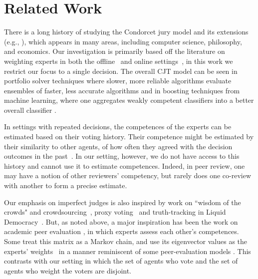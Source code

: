 \documentclass[letterpaper]{article} %
\begin{document}
\section{Related Work}
%
There is a long history of studying the Condorcet jury model and its extensions (e.g., \citet{berend1998condorcet,ben2000nonasymptotic,grofman1978judgmental,feld1984accuracy}), which appears in many areas, including computer science, philosophy, and economics. Our investigation is primarily based off the literature on weighting experts in both the offline~\cite{shapley1984optimizing,nitzan1982optimal} and online settings~\cite{cesa1997use,vovk1990aggregating,freeman2020no, berend2015finite}, in this work we restrict our focus to a single decision. The overall CJT model can be seen in portfolio solver techniques where slower, more reliable algorithms evaluate ensembles of faster, less accurate algorithms \cite{thornton2013auto} and in boosting techniques from machine learning, where one aggregates weakly competent classifiers into a better overall classifier \cite{schapire2013boosting}.

In settings with repeated decisions, the competences of the experts can be estimated based on their voting history. Their competence might be estimated by their similarity to other agents, of how often they agreed with the decision outcomes in the past~\cite{grofman1983thirteen,baharad2012beyond,romeijn2011learning}. In our setting, however, we do not have access to this history and cannot use it to estimate competences. Indeed, in peer review, one may have a notion of other reviewers' competency, but rarely does one co-review with another to form a precise estimate.%

Our emphasis on imperfect judges is also inspired by work on ``wisdom of the crowds" and crowdsourcing~\cite{surowiecki2005wisdom,brabham2013using,brabham2015crowdsourcing}, proxy voting~\cite{abramowitz2019flexible,pivato2020weighted} and truth-tracking in Liquid Democracy~\cite{zhang2022tracking,becker2021unveiling}. But, as noted above, a major inspiration has been the work on academic peer evaluation \cite{Shah22CACM}, in which experts assess each other's competences. Some treat this matrix as a Markov chain, and use its eigenvector values as the experts' weights~\cite{grofman1983determining} in a manner reminiscent of some peer-evaluation models \cite{page1999pagerank,Wal14,LMTZ23}.
%
This contrasts with our setting in which the set of agents who vote and the set of agents who weight the voters are disjoint.
\end{document}

